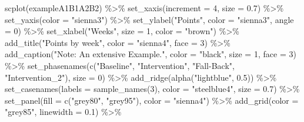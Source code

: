 \documentclass[
  letterpaper,
  DIV=11,
  numbers=noendperiod]{scrreprt}
\newenvironment{Shaded}{\begin{snugshade}}{\end{snugshade}}
\newcommand{\AttributeTok}[1]{\textcolor[rgb]{0.40,0.45,0.13}{#1}}
\newcommand{\DecValTok}[1]{\textcolor[rgb]{0.68,0.00,0.00}{#1}}
\newcommand{\FloatTok}[1]{\textcolor[rgb]{0.68,0.00,0.00}{#1}}
\newcommand{\FunctionTok}[1]{\textcolor[rgb]{0.28,0.35,0.67}{#1}}
\newcommand{\NormalTok}[1]{\textcolor[rgb]{0.00,0.23,0.31}{#1}}
\newcommand{\SpecialCharTok}[1]{\textcolor[rgb]{0.37,0.37,0.37}{#1}}
\newcommand{\StringTok}[1]{\textcolor[rgb]{0.13,0.47,0.30}{#1}}
\begin{document}
\begin{Shaded}
\begin{Highlighting}[]
\FunctionTok{scplot}\NormalTok{(exampleA1B1A2B2) }\SpecialCharTok{\%\textgreater{}\%} 
  \FunctionTok{set\_xaxis}\NormalTok{(}\AttributeTok{increment =} \DecValTok{4}\NormalTok{, }\AttributeTok{size =} \FloatTok{0.7}\NormalTok{) }\SpecialCharTok{\%\textgreater{}\%}
  \FunctionTok{set\_yaxis}\NormalTok{(}\AttributeTok{color =} \StringTok{"sienna3"}\NormalTok{) }\SpecialCharTok{\%\textgreater{}\%}
  \FunctionTok{set\_ylabel}\NormalTok{(}\StringTok{"Points"}\NormalTok{, }\AttributeTok{color =} \StringTok{"sienna3"}\NormalTok{, }\AttributeTok{angle =} \DecValTok{0}\NormalTok{) }\SpecialCharTok{\%\textgreater{}\%}
  \FunctionTok{set\_xlabel}\NormalTok{(}\StringTok{"Weeks"}\NormalTok{, }\AttributeTok{size =} \DecValTok{1}\NormalTok{, }\AttributeTok{color =} \StringTok{"brown"}\NormalTok{) }\SpecialCharTok{\%\textgreater{}\%}
  \FunctionTok{add\_title}\NormalTok{(}\StringTok{"Points by week"}\NormalTok{, }\AttributeTok{color =} \StringTok{"sienna4"}\NormalTok{, }\AttributeTok{face =} \DecValTok{3}\NormalTok{) }\SpecialCharTok{\%\textgreater{}\%}
  \FunctionTok{add\_caption}\NormalTok{(}\StringTok{"Note: An extensive Example."}\NormalTok{,}
              \AttributeTok{color =} \StringTok{"black"}\NormalTok{, }\AttributeTok{size =} \DecValTok{1}\NormalTok{, }\AttributeTok{face =} \DecValTok{3}\NormalTok{) }\SpecialCharTok{\%\textgreater{}\%}
  \FunctionTok{set\_phasenames}\NormalTok{(}\FunctionTok{c}\NormalTok{(}\StringTok{"Baseline"}\NormalTok{, }\StringTok{"Intervention"}\NormalTok{, }\StringTok{"Fall{-}Back"}\NormalTok{, }\StringTok{"Intervention\_2"}\NormalTok{), }
                 \AttributeTok{size =} \DecValTok{0}\NormalTok{) }\SpecialCharTok{\%\textgreater{}\%}
  \FunctionTok{add\_ridge}\NormalTok{(}\FunctionTok{alpha}\NormalTok{(}\StringTok{"lightblue"}\NormalTok{, }\FloatTok{0.5}\NormalTok{)) }\SpecialCharTok{\%\textgreater{}\%}
  \FunctionTok{set\_casenames}\NormalTok{(}\AttributeTok{labels =} \FunctionTok{sample\_names}\NormalTok{(}\DecValTok{3}\NormalTok{), }\AttributeTok{color =} \StringTok{"steelblue4"}\NormalTok{, }\AttributeTok{size =} \FloatTok{0.7}\NormalTok{) }\SpecialCharTok{\%\textgreater{}\%}
  \FunctionTok{set\_panel}\NormalTok{(}\AttributeTok{fill =} \FunctionTok{c}\NormalTok{(}\StringTok{"grey80"}\NormalTok{, }\StringTok{"grey95"}\NormalTok{), }\AttributeTok{color =} \StringTok{"sienna4"}\NormalTok{) }\SpecialCharTok{\%\textgreater{}\%}
  \FunctionTok{add\_grid}\NormalTok{(}\AttributeTok{color =} \StringTok{"grey85"}\NormalTok{, }\AttributeTok{linewidth =} \FloatTok{0.1}\NormalTok{) }\SpecialCharTok{\%\textgreater{}\%}

\end{Highlighting}
\end{Shaded}
\end{document}
